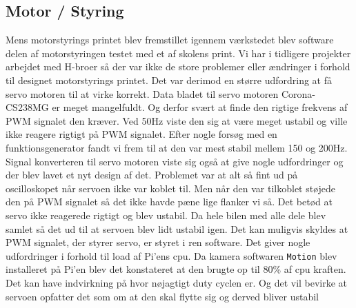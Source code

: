 \subsection{Motor / Styring} \label{sec:hwi_motor_styring}
Mens motorstyrings printet blev fremstillet igennem værkstedet blev software delen af motorstyringen testet med et af skolens print. Vi har i tidligere projekter arbejdet med H-broer så der var ikke de store problemer eller ændringer i forhold til designet motorstyrings printet.\newline
Det var derimod en større udfordring at få servo motoren til at virke korrekt.  
Data bladet til servo motoren Corona-CS238MG \cite{lib:Corona-CS238MG} er meget mangelfuldt. Og derfor svært at finde den rigtige frekvens af PWM signalet den kræver. 
Ved 50Hz viste den sig at være meget ustabil og ville ikke reagere rigtigt på PWM signalet. 
Efter nogle forsøg med en funktionsgenerator fandt vi frem til at den var mest stabil mellem 150 og 200Hz. 
Signal konverteren til servo motoren viste sig også at give nogle udfordringer og der blev lavet et nyt design af det.
Problemet var at alt så fint ud på oscilloskopet når servoen ikke var koblet til. 
Men når den var tilkoblet støjede den på PWM signalet så det ikke havde pæne lige flanker vi så. 
Det betød at servo ikke reagerede rigtigt og blev ustabil.
Da hele bilen med alle dele blev samlet så det ud til at servoen blev lidt ustabil igen. Det kan muligvis skyldes at PWM signalet, der styrer servo, er styret i ren software. 
Det giver nogle udfordringer i forhold til load af Pi'ens cpu. Da kamera softwaren \texttt{Motion} blev installeret på Pi'en blev det konstateret at den brugte op til 80\% af cpu kraften. Det kan have indvirkning på hvor nøjagtigt duty cyclen er. Og det vil bevirke at servoen opfatter det som om at den skal flytte sig og derved bliver ustabil